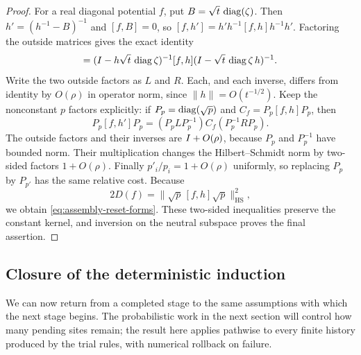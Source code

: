 \begin{proof}
For a real diagonal potential $f$, put $B=\sqrt t\,\operatorname{diag}(\zeta)$.
Then $h'=(h^{-1}-B)^{-1}$ and $[f,B]=0$, so
$[f,h']=h'h^{-1}[f,h]h^{-1}h'$.
Factoring the outside matrices gives the exact identity
\begin{equation}
 [f,h']
 =(\Id-h\sqrt t\,\diag\zeta)^{-1}
    [f,h]
   (\Id-\sqrt t\,\diag\zeta\,h)^{-1}.
 \label{eq:assembly-reset-commutator}
\end{equation}
Write the two outside factors as $L$ and $R$. Each, and each inverse,
differs from identity by $O(\rho)$ in operator norm, since
$\|h\|=O(t^{-1/2})$. Keep the nonconstant $p$ factors explicitly:
if $P_p=\operatorname{diag}(\sqrt p)$ and $C_f=P_p[f,h]P_p$, then
\[
 P_p[f,h']P_p
   =(P_pLP_p^{-1})C_f(P_p^{-1}RP_p).
\]
The outside factors and their inverses are $I+O(\rho)$, because
$P_p$ and $P_p^{-1}$ have bounded norm. Their multiplication changes
the Hilbert--Schmidt norm by two-sided factors $1+O(\rho)$.
Finally $p'_i/p_i=1+O(\rho)$ uniformly, so replacing $P_p$ by
$P_{p'}$ has the same relative cost. Because
\[
 2D(f)=\|\sqrt p\,[f,h]\sqrt p\|_{\mathrm{HS}}^2,
\]
we obtain \eqref{eq:assembly-reset-forms}.
These two-sided inequalities preserve the constant kernel, and inversion
on the neutral subspace proves the final assertion.
\end{proof}

\subsection{Closure of the deterministic induction}

We can now return from a completed stage to the same assumptions with
which the next stage begins. The probabilistic work in the next section
will control how many pending sites remain; the result here applies
pathwise to every finite history produced by the trial rules, with
numerical rollback on failure.

